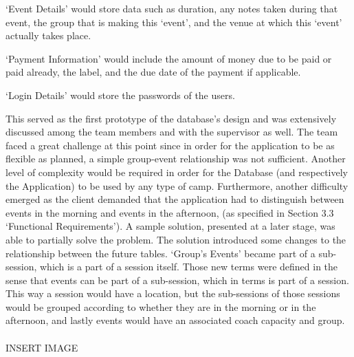 \documentclass{l3proj}
\begin{document}
\par 
`Event Details' would store data such as duration, any notes taken during that event, the group that is making this `event', and the venue at which this ‘event’ actually takes place.\\
\par 
`Payment Information' would include the amount of money due to be paid or paid already, the label, and the due date of the payment if applicable.\\
\par 
`Login Details' would store the passwords of the users.\\
\par 
This served as the first prototype of the database’s design and was extensively discussed among the team members and with the supervisor as well. The team faced a great challenge at this point since in order for the application to be as flexible as planned, a simple group-event relationship was not sufficient. Another level of complexity would be required in order for the Database (and respectively the Application) to be used by any type of camp. Furthermore, another difficulty emerged as the client demanded that the application had to distinguish between events in the morning and events in the afternoon, (as specified in Section 3.3 `Functional Requirements'). A sample solution, presented at a later stage, was able to partially solve the problem. The solution introduced some changes to the relationship between the future tables. `Group’s Events' became part of a sub-session, which is a part of a session itself. Those new terms were defined in the sense that events can be part of a sub-session, which in terms is part of a session. This way a session would have a location, but the sub-sessions of those sessions would be grouped according to whether they are in the morning or in the afternoon, and lastly events would have an associated coach capacity and group.\\
\\
{\LARGE{INSERT IMAGE}}\\
\par
\end{document}
